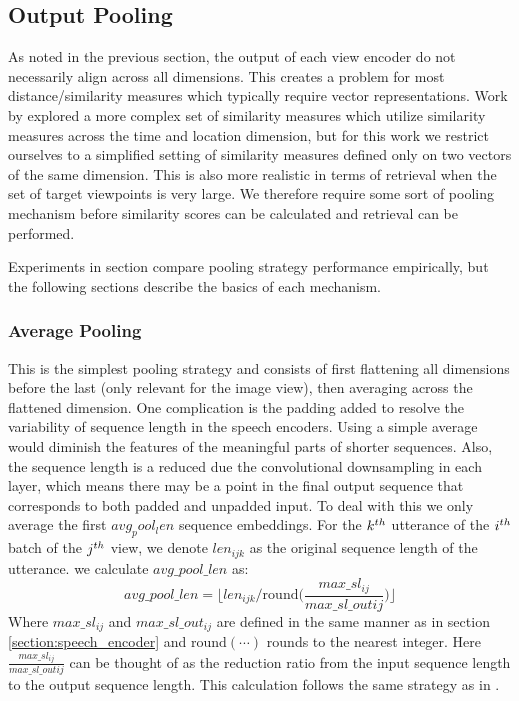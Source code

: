 \subsection{Output Pooling}
\label{section:output_pooling}
As noted in the previous section, the output of each view encoder do not necessarily align across all dimensions. 
This creates a problem for most distance/similarity measures which typically require vector representations.
Work by \cite{harwath2018jointly} explored a more complex set of similarity measures which utilize similarity measures across the time and location dimension, but for this work we restrict ourselves to a simplified setting of similarity measures defined only on two vectors of the same dimension.
This is also more realistic in terms of retrieval when the set of target viewpoints is very large.
We therefore require some sort of pooling mechanism before similarity scores can be calculated and retrieval can be performed.


Experiments in section  compare pooling strategy performance empirically, but the following sections describe the basics of each mechanism.

\subsubsection{Average Pooling}
\label{section:average_pooling}
This is the simplest pooling strategy and consists of first flattening all dimensions before the last (only relevant for the image view), then averaging across the flattened dimension.
One complication is the padding added to resolve the variability of sequence length in the speech encoders.
Using a simple average would diminish the features of the meaningful parts of shorter sequences.
Also, the sequence length is a reduced due the convolutional downsampling in each layer, which means there may be a point in the final output sequence that corresponds to both padded and unpadded input.
To deal with this we only average the first $avg_pool_len$ sequence embeddings. 
For the $k^{th}$ utterance of the  $i^{th}$ batch of the $j^{th}$ view, we denote $len_{ijk}$ as the original sequence length of the utterance. 
we calculate $avg\_pool\_len$ as:
\begin{equation*}
    avg\_pool\_len = \lfloor  len_{ijk} / \text{round}\Big( \frac{max\_sl_{ij}}{max\_sl\_out{ij}} \Big) \rfloor
\end{equation*}
Where $max\_sl_{ij}$ and $max\_sl\_out_{ij}$ are defined in the same manner as in section \ref{section:speech_encoder} and $\text{round}(\cdots)$ rounds to the nearest integer.
Here $\frac{max\_sl_{ij}}{max\_sl\_out{ij}}$ can be thought of as the reduction ratio from the input sequence length to the output sequence length.
This calculation follows the same strategy as in .

